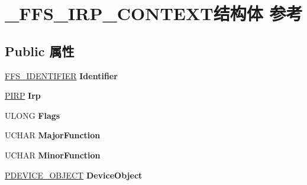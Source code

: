 \hypertarget{struct___f_f_s___i_r_p___c_o_n_t_e_x_t}{}\section{\+\_\+\+F\+F\+S\+\_\+\+I\+R\+P\+\_\+\+C\+O\+N\+T\+E\+X\+T结构体 参考}
\label{struct___f_f_s___i_r_p___c_o_n_t_e_x_t}
\subsection*{Public 属性}
\begin{DoxyCompactItemize}
\item 
\mbox{\label{struct___f_f_s___i_r_p___c_o_n_t_e_x_t_a4cb9ca1d9fca422e0e9917d9dea553fa}} 
\hyperlink{struct___f_f_s___i_d_e_n_t_i_f_i_e_r}{F\+F\+S\+\_\+\+I\+D\+E\+N\+T\+I\+F\+I\+ER} {\bfseries Identifier}
\item 
\mbox{\label{struct___f_f_s___i_r_p___c_o_n_t_e_x_t_a132a14e5c7c120489babbbfbb9d65ee8}} 
\hyperlink{interfacevoid}{P\+I\+RP} {\bfseries Irp}
\item 
\mbox{\label{struct___f_f_s___i_r_p___c_o_n_t_e_x_t_af7e2937ed2cdf2e9d374779e6baf1f51}} 
U\+L\+O\+NG {\bfseries Flags}
\item 
\mbox{\label{struct___f_f_s___i_r_p___c_o_n_t_e_x_t_abad558f6521de3f0b567314f4b4fd564}} 
U\+C\+H\+AR {\bfseries Major\+Function}
\item 
\mbox{\label{struct___f_f_s___i_r_p___c_o_n_t_e_x_t_ac0e86d3445659e4da81aa60f80926ce9}} 
U\+C\+H\+AR {\bfseries Minor\+Function}
\item 
\mbox{\label{struct___f_f_s___i_r_p___c_o_n_t_e_x_t_a90826200cc363d23cd3eec8ccecfecdb}} 
\hyperlink{struct___d_e_v_i_c_e___o_b_j_e_c_t}{P\+D\+E\+V\+I\+C\+E\+\_\+\+O\+B\+J\+E\+CT} {\bfseries Device\+Object}
\item 
\mbox{\label{struct___f_f_s___i_r_p___c_o_n_t_e_x_t_ad2a00d005a25ade0a18c3cbc7dbe5a52}} 

\end{DoxyCompactItemize}
